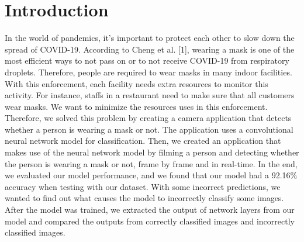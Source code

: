 \section{Introduction}
In the world of pandemics, it’s important to protect each other to slow down the spread of COVID-19.
According to Cheng et al. [1], wearing a mask is one of the most efficient ways to not pass on or to not receive COVID-19 from respiratory droplets.
Therefore, people are required to wear masks in many indoor facilities.
With this enforcement, each facility needs extra resources to monitor this activity.
For instance, staffs in a restaurant need to make sure that all customers wear masks.
We want to minimize the resources uses in this enforcement.
Therefore, we solved this problem by creating a camera application that detects whether a person is wearing a mask or not.
The application uses a convolutional neural network model for classification.
Then, we created an application that makes use of the neural network model by filming a person and detecting whether the person is wearing a mask or not, frame by frame and in real-time.
In the end, we evaluated our model performance, and we found that our model had a 92.16\% accuracy when testing with our dataset.
With some incorrect predictions, we wanted to find out what causes the model to incorrectly classify some images.
After the model was trained, we extracted the output of network layers from our model and compared the outputs from correctly classified images and incorrectly classified images.

